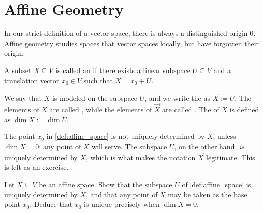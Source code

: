 \section{Affine Geometry}

In our strict definition of a vector space, there is always a distinguished origin $0$. Affine geometry studies spaces that  vector spaces locally, but have forgotten their origin.

\begin{definition}
  \label{def:affine_space}
  A subset $X \subseteq V$ is called an  if there exists a linear subspace $U \subseteq V$ and a translation vector $x_0 \in V$ such that $X = x_0 + U$.

  We say that $X$ is modeled on the subspace $U$, and we write the  as $\vec{X} := U$. The elements of $X$ are called , while the elements of $\vec{X}$ are called .
  The  of $X$ is defined as $\dim X := \dim U$.
\end{definition}

\begin{remark}
\label{rem:affine_x0_not_unique}
The point $x_0$ in \cref{def:affine_space} is not uniquely determined by $X$, unless $\dim X = 0$: any point of $X$ will serve. The subspace $U$, on the other hand, \emph{is} uniquely determined by $X$, which is what makes the notation $\vec{X}$ legitimate. This is left as an exercise.
\end{remark}

\begin{exercise}
\label{exc:direction_space_unique}
Let $X \subseteq V$ be an affine space. Show that the subspace $U$ of \cref{def:affine_space} is uniquely determined by $X$, and that any point of $X$ may be taken as the base point $x_0$. Deduce that $x_0$ is unique precisely when $\dim X = 0$.
\end{exercise}

